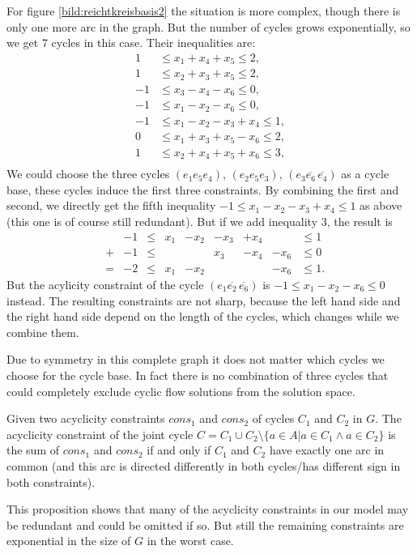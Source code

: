 For figure \ref{bild:reichtkreisbasis2} the situation is more complex, though there is only one more arc in the graph. 
But the number of cycles grows exponentially, so we get 7 cycles in this case. Their inequalities are:
\begin{align*}
 1 &\le x_1+x_4+x_5\le 2,\\
 1&\le x_2+x_3+x_5\le 2 ,\\%
 -1&\le x_3-x_4-x_6\le 0,\\
 -1&\le x_1-x_2-x_6\le 0,\\ 
 -1 &\le x_1-x_2-x_3+x_4 \le 1,\\
 0 &\le x_1+x_3+x_5-x_6\le 2,\\
 1&\le x_2+x_4+x_5+x_6\le 3,\\
\end{align*}
We could choose the three cycles $(e_1 e_5 e_4)$, $(e_2 e_5 e_3)$, $(e_3 \overline{e_6}\, \overline{e_4})$ as a cycle 
base, these cycles induce the first three constraints. By combining the first and second, we directly get the fifth 
inequality $-1 \le x_1-x_2-x_3+x_4 \le 1$ as above (this one is of course still redundant). But if we add inequality 
$3$, the result is 
\begin{align*}
 &&-1 &\le &x_1&-x_2&-x_3&+x_4 &&\le 1\\
 &+&-1&\le &&&x_3&-x_4&-x_6&\le 0\\
 &=&-2&\le&x_1&-x_2&&&-x_6&\le 1.
\end{align*}
But the acylicity constraint of the cycle $(e_1 \overline{e_2} \,\overline{e_6})$ is $-1\le x_1-x_2-x_6\le 0$ instead. 
The resulting constraints are not sharp, because the left hand side and the right hand side depend on the length of the 
cycles, which changes while we combine them.

Due to symmetry in this complete graph it does not matter which cycles we choose for the cycle base. In fact there is 
no combination of three cycles that could completely exclude cyclic flow solutions from the solution space.

\begin{prop}
\label{prop:redundantAcyclicityCons}
 Given two acyclicity constraints $cons_1$ and $cons_2$ of cycles $C_1$ and $C_2$ in $G$. The acyclicity constraint of 
the joint cycle $C=C_1\cup C_2 \setminus \{a\in A| a\in C_1\land a\in C_2 \}$ is the sum of $cons_1$ and $cons_2$ if 
and only if $C_1$ and $C_2$ have exactly one arc in common (and this arc is directed differently in both 
cycles/has different sign in both constraints).
\end{prop}
This proposition shows that many of the acyclicity constraints in our model may be redundant and could be omitted if 
so. But still the remaining constraints are exponential in the size of $G$ in the worst case.

